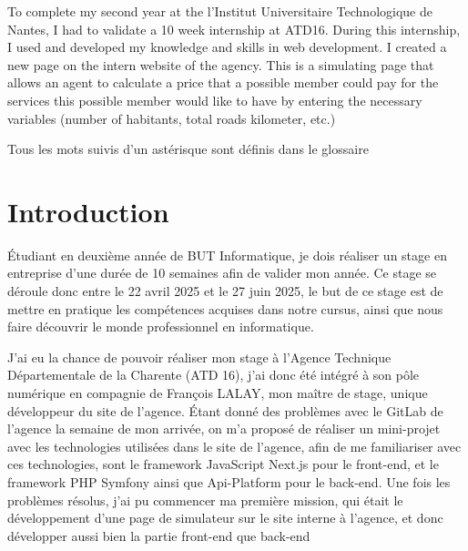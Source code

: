 \documentclass[a4paper,12pt]{report}
\begin{document}
\vspace{1em}

To complete my second year at the l’Institut Universitaire Technologique de Nantes, I had to validate a 10 week internship at ATD16. During this internship, I used and developed my knowledge and skills in web development. I created a new page on the intern website of the agency. This is a simulating page that allows an agent to calculate a price that a possible member could pay for the services this possible member would like to have by entering the necessary variables (number of habitants, total roads kilometer, etc.)


\tableofcontents               

\newpage
\thispagestyle{empty}
\vspace*{\fill}            
\begin{center}             
Tous les mots suivis d'un astérisque sont définis dans le glossaire
\end{center}
\vspace*{\fill}            


\chapter{Introduction}         
Étudiant en deuxième année de BUT Informatique, je dois réaliser un stage en entreprise d'une durée de 10 semaines afin de valider mon année. Ce stage se déroule donc entre le 22 avril 2025 et le 27 juin 2025, le but de ce stage est de mettre en pratique les compétences acquises dans notre cursus, ainsi que nous faire découvrir le monde professionnel en informatique.

\vspace{1em}

J'ai eu la chance de pouvoir réaliser mon stage à l'Agence Technique Départementale de la Charente (ATD 16), j'ai donc été intégré à son pôle numérique en compagnie de François LALAY, mon maître de stage, unique développeur du site de l'agence. Étant donné des problèmes avec le GitLab de l'agence la semaine de mon arrivée, on m'a proposé de réaliser un mini-projet avec les technologies utilisées dans le site de l'agence, afin de me familiariser avec ces technologies, sont le framework JavaScript Next.js pour le front-end, et le framework PHP Symfony ainsi que Api-Platform pour le back-end. Une fois les problèmes résolus, j'ai pu commencer ma première mission, qui était le développement d'une page de simulateur sur le site interne à l'agence, et donc développer aussi bien la partie front-end que back-end
\end{document}
